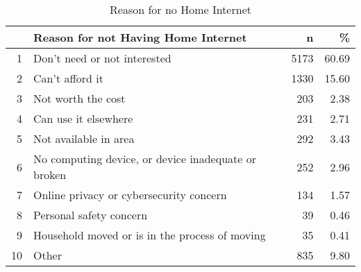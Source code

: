 \begin{table}[ht]
\centering
\begin{tabular}{rlrr}
  \hline
 & Reason for not Having Home Internet & n & \% \\ 
  \hline
1 & Don't need or not interested & 5173 & 60.69 \\ 
  2 & Can't afford it & 1330 & 15.60 \\ 
  3 & Not worth the cost & 203 & 2.38 \\ 
  4 & Can use it elsewhere & 231 & 2.71 \\ 
  5 & Not available in area & 292 & 3.43 \\ 
  6 & No computing device, or device inadequate or broken & 252 & 2.96 \\ 
  7 & Online privacy or cybersecurity concern & 134 & 1.57 \\ 
  8 & Personal safety concern &  39 & 0.46 \\ 
  9 & Household moved or is in the process of moving &  35 & 0.41 \\ 
  10 & Other & 835 & 9.80 \\ 
   \hline
\end{tabular}
\caption{Reason for no Home Internet} 
\end{table}
